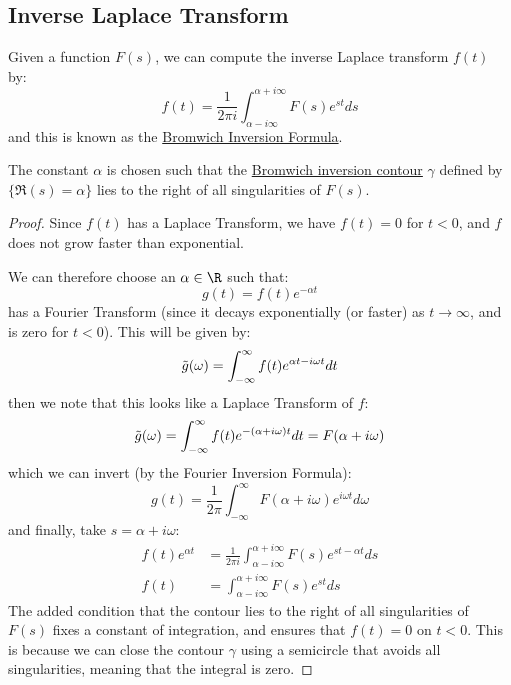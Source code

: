\documentclass[../Main.tex]{subfiles}
\begin{document}
\subsection{Inverse Laplace Transform}
\begin{proposition}
    Given a function $F(s)$, we can compute the inverse Laplace transform $f(t)$ by:
    \begin{equation}
        f(t) = \frac1{2\pi i} \int_{\alpha - i \infty}^{\alpha + i \infty} F(s) e^{st} ds 
        \label{eqnInverseLaplace}
    \end{equation}
    and this is known as the \underline{Bromwich Inversion Formula}.

    The constant $\alpha$ is chosen such that the \underline{Bromwich inversion contour} $\gamma$ defined by $\{\Re(s) = \alpha\}$ lies to the right of all singularities of $F(s)$.
    \label{propInverseLaplace}
\end{proposition}
\begin{proof}
    Since $f(t)$ has a Laplace Transform, we have $f(t) = 0$ for $t < 0$, and $f$ does not grow faster than exponential.

    We can therefore choose an $\alpha \in \R$ such that:
    \begin{equation*}
        g(t) = f(t) e^{-\alpha t}
    \end{equation*}
    has a Fourier Transform (since it decays exponentially (or faster) as $t \to \infty$, and is zero for $t < 0$). This will be given by:
    \begin{equation*}
        \tilde{g}(\omega) = \int_{-\infty}^{\infty} f(t)e^{\alpha t - i \omega t} dt
    \end{equation*}
    then we note that this looks like a Laplace Transform of $f$:
    \begin{equation*}
        \tilde{g}(\omega) = \int_{-\infty}^{\infty} f(t)e^{-(\alpha + i \omega)t} dt = F(\alpha + i \omega)
    \end{equation*}
    which we can invert (by the Fourier Inversion Formula):
    \begin{equation*}
        g(t) = \frac{1}{2\pi} \int_{-\infty}^{\infty} F(\alpha + i \omega) e^{i \omega t} d\omega
    \end{equation*}
    and finally, take $s = \alpha + i \omega$:
    \begin{align*}
        f(t) e^{\alpha t} &= \frac{1}{2\pi i} \int_{\alpha - i \infty}^{\alpha + i \infty} F(s) e^{st - \alpha t} ds \\
        f(t) &= \int_{\alpha - i \infty}^{\alpha + i \infty} F(s) e^{st} ds
    \end{align*}
    The added condition that the contour lies to the right of all singularities of $F(s)$ fixes a constant of integration, and ensures that $f(t) = 0$ on $t < 0$. This is because we can close the contour $\gamma$ using a semicircle that avoids all singularities, meaning that the integral is zero.
\end{proof}
\end{document}
